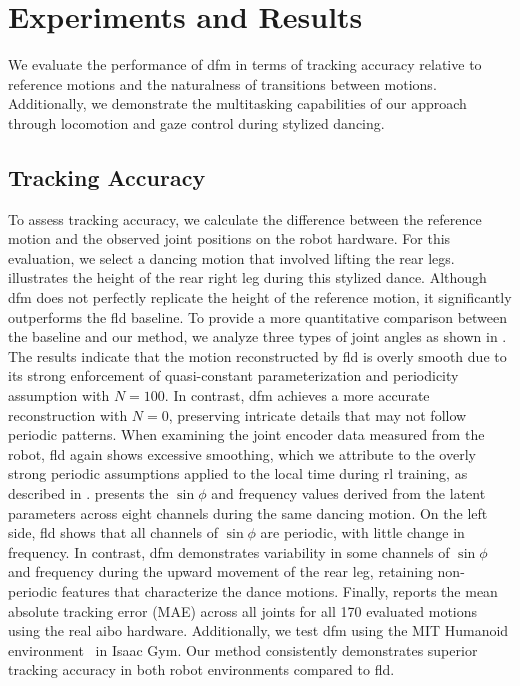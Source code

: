 \section{Experiments and Results}
We evaluate the performance of \ac{dfm} in terms of tracking accuracy relative to reference motions and the naturalness of transitions between motions. 
Additionally, we demonstrate the multitasking capabilities of our approach through locomotion and gaze control during stylized dancing.

\subsection{Tracking Accuracy}
To assess tracking accuracy, we calculate the difference between the reference motion and the observed joint positions on the robot hardware.
For this evaluation, we select a dancing motion that involved lifting the rear legs.
 illustrates the height of the rear right leg during this stylized dance.
Although \ac{dfm} does not perfectly replicate the height of the reference motion, it significantly outperforms the \ac{fld} baseline.
To provide a more quantitative comparison between the baseline and our method, we analyze three types of joint angles as shown in .
The results indicate that the motion reconstructed by \ac{fld} is overly smooth due to its strong enforcement of quasi-constant parameterization and periodicity assumption with $N = 100$.
In contrast, \ac{dfm} achieves a more accurate reconstruction with $N = 0$, preserving intricate details that may not follow periodic patterns.
When examining the joint encoder data measured from the robot, \ac{fld} again shows excessive smoothing, which we attribute to the overly strong periodic assumptions applied to the local time during \ac{rl} training, as described in .
 presents the $\sin{\phi}$ and frequency values derived from the latent parameters across eight channels during the same dancing motion.
On the left side, \ac{fld} shows that all channels of $\sin{\phi}$ are periodic, with little change in frequency.
In contrast, \ac{dfm} demonstrates variability in some channels of $\sin{\phi}$ and frequency during the upward movement of the rear leg, retaining non-periodic features that characterize the dance motions.
Finally,  reports the mean absolute tracking error (MAE) across all joints for all 170 evaluated motions using the real aibo hardware.
Additionally, we test \ac{dfm} using the MIT Humanoid environment~\cite{chignoli2021humanoid} in Isaac Gym.
Our method consistently demonstrates superior tracking accuracy in both robot environments compared to \ac{fld}.


